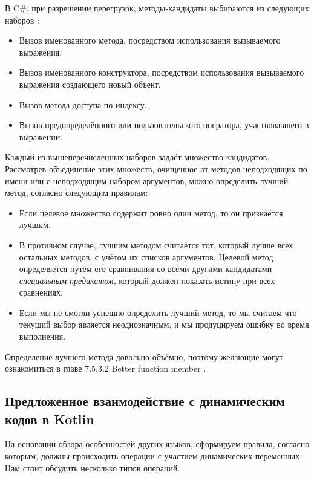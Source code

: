 В C{\#}, при разрешении перегрузок, методы-кандидаты выбираются из следующих наборов \cite{csharp:languageSpecification}:

\begin{itemize}
    \item Вызов именованного метода, посредством использования вызываемого выражения.
    \item Вызов именованного конструктора, посредством использования вызываемого выражения создающего новый объект.
    \item Вызов метода доступа по индексу.
    \item Вызов предопределённого или пользовательского оператора, участвовавшего в выражении.
\end{itemize}

Каждый из вышеперечисленных наборов задаёт множество кандидатов. Рассмотрев объединение этих множеств, очищенное от методов неподходящих по имени или с неподходящим набором аргументов, можно определить лучший метод, согласно следующим правилам:

\begin{itemize}
    \item Если целевое множество содержит ровно один метод, то он признаётся лучшим.
    \item В противном случае, лучшим методом считается тот, который лучше всех остальных методов, с учётом их списков аргументов. Целевой метод определяется путём его сравнивания со всеми другими кандидатами \textit{специальным предикатом}, который должен показать истину при всех сравнениях.
    \item Если мы не смогли успешно определить лучший метод, то мы считаем что текущий выбор является неоднозначным, и мы продуцируем ошибку во время выполнения.
\end{itemize}

Определение лучшего метода довольно объёмно, поэтому желающие могут ознакомиться в главе 7.5.3.2 Better function member \cite{csharp:languageSpecification}.


\subsection{Предложенное взаимодействие с динамическим кодов в Kotlin}

На основании обзора особенностей других языков, сформируем правила, согласно которым, должны происходить операции с участием динамических переменных. Нам стоит обсудить несколько типов операций.

